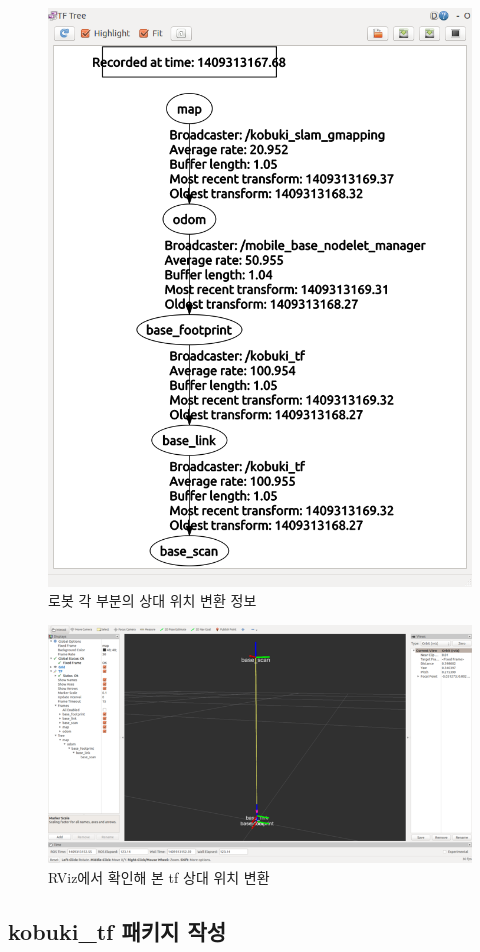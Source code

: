 \begin{figure}[h]
\centering
\includegraphics[width=0.7\columnwidth]{pictures/chapter11/slam_tf.png}
\caption{로봇 각 부분의 상대 위치 변환 정보}
\end{figure}

\begin{figure}[h]
\centering
\includegraphics[width=0.9\columnwidth]{pictures/chapter11/rviz_slam_tf.png}
\caption{RViz에서 확인해 본 tf 상대 위치 변환}
\end{figure}

\subsection{kobuki\_tf 패키지 작성}

